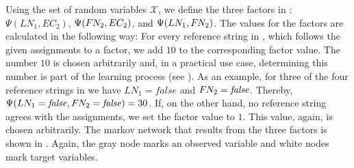 Using the set of \glspl{random variable} $\mathcal{X}$, we define the three factors in : $\Psi(LN_1,EC_2)$, $\Psi(F\hspace{-0.07em} N_2,EC_2)$, and $\Psi(LN_1,F\hspace{-0.07em} N_2)$.
The values for the factors are calculated in the following way:
For every reference string in , which follows the given \glspl{assignment} to a \gls{factor}, we add $10$ to the corresponding factor value.
The number $10$ is chosen arbitrarily and, in a practical use case, determining this number is part of the learning process (see ).
As an example, for three of the four reference strings in  we have $LN_1=\mathit{false}$ and $F\hspace{-0.07em} N_2=\mathit{false}$.
Thereby, $\Psi(LN_1=\mathit{false},F\hspace{-0.07em} N_2=\mathit{false})=30$.
If, on the other hand, no reference string agrees with the \glspl{assignment}, we set the factor value to $1$.
This value, again, is chosen arbitrarily.
The \gls{markov network} that results from the three \glspl{factor} is shown in .
Again, the gray \gls{node} marks an \gls{observed variable} and white \glspl{node} mark \glspl{target variable}.

